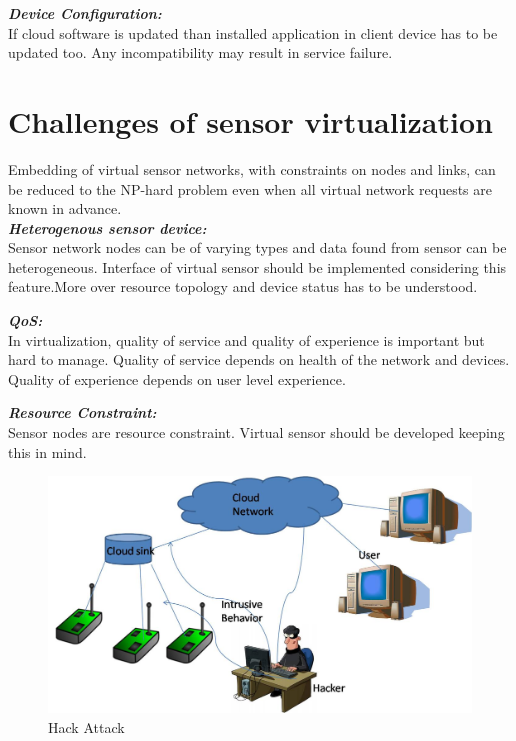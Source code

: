 \documentclass {report}
\begin{document}
{\bfseries \emph{Device Configuration:}\\}\indent If cloud software is updated than installed application in client device has to be updated too. Any incompatibility may result in service failure.\\

\chapter{Challenges of sensor virtualization}

Embedding of virtual sensor networks, with constraints on nodes and links, can be reduced to the NP-hard problem even when all virtual network requests are known in advance.\\

{\bfseries \emph{Heterogenous sensor device:}\\}Sensor network nodes can be of varying types and data found from sensor can be heterogeneous. Interface of virtual sensor should be implemented considering this feature.More over resource topology and device status has to be understood. 

{\bfseries \emph{QoS:}\\}In virtualization, quality of service and quality of experience is important but hard to manage. Quality of service depends on health of the network and devices. Quality of experience depends on user level experience.

{\bfseries \emph{Resource Constraint:}\\}Sensor nodes are resource constraint. Virtual sensor should be developed keeping this in mind. 

\begin{figure}
\begin{center}
\includegraphics [scale=0.5]{hack2}
\caption{Hack Attack}
\end{center}
\end{figure}
\newpage
\end{document}
